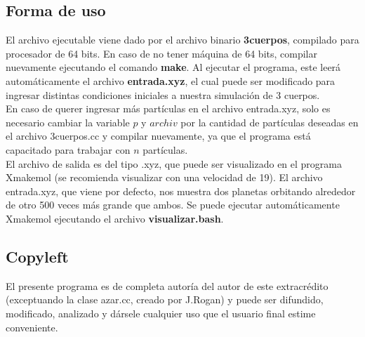 \documentclass[12pt]{article}
\begin{document}
\subsection {Forma de uso} El archivo ejecutable viene dado por el
archivo binario
\textbf{3cuerpos}, compilado para procesador de 64 bits. En caso de no
tener m\'aquina de 64 bits, compilar nuevamente ejecutando el comando
\textbf{make}. Al ejecutar el programa, este leer\'a autom\'aticamente
el archivo \textbf{entrada.xyz}, el cual puede ser modificado para ingresar
distintas condiciones iniciales a nuestra simulaci\'on de 3 cuerpos.\\

En caso de querer ingresar m\'as part\'iculas en el archivo entrada.xyz, solo es necesario cambiar la
variable $p$ y $archiv$ por la cantidad de part\'iculas deseadas en el archivo
3cuerpos.cc y compilar nuevamente, ya que el programa est\'a
capacitado para trabajar con $n$ part\'iculas.\\ 

El archivo de salida es del tipo .xyz, que puede ser visualizado en el
programa Xmakemol (se recomienda visualizar con una velocidad de 19).
El archivo entrada.xyz, que viene por defecto, nos muestra dos
planetas orbitando alrededor de otro 500 veces m\'as grande que ambos.
Se puede ejecutar autom\'aticamente Xmakemol ejecutando el archivo
\textbf{visualizar.bash}.

\subsection{Copyleft} El presente programa es de completa autor\'ia
del autor de este extracr\'edito (exceptuando la clase azar.cc, creado
por J.Rogan) y puede ser difundido, modificado, analizado y d\'arsele cualquier
uso que el usuario final estime conveniente. 
\end{document}
